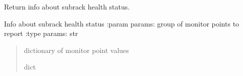 \documentclass[letterpaper,10pt,english]{sphinxmanual}
\begin{document}
\begin{fulllineitems}
\label{\detokenize{webserverdocs:subrack_hardware.GetHealthStatus}}
\pysigstartsignatures
{}
\pysigstopsignatures
\sphinxAtStartPar
Return info about subrack health status.

\begin{fulllineitems}
\label{\detokenize{webserverdocs:subrack_hardware.GetHealthStatus.do}}
\pysigstartsignatures
{}
\pysigstopsignatures
\sphinxAtStartPar
Info about subrack health status
:param params: group of monitor points to report
:type params: str
\begin{quote}\begin{description}
\sphinxAtStartPar
dictionary of monitor point values

\sphinxAtStartPar
dict

\end{description}\end{quote}

\end{fulllineitems}


\end{fulllineitems}

\end{document}
